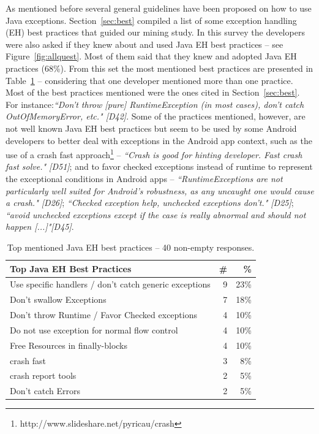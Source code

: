 
As mentioned before several general guidelines have been proposed on how to
use Java exceptions. Section~\ref{sec:best}  compiled a list of some exception handling (EH) best practices that guided our mining study. In this survey the developers were also asked if they knew about and used Java EH best practices -- see Figure~\ref{fig:allquest}. Most of them said that they knew and adopted Java EH practices (68\%). From this set the most mentioned best practices are presented in Table~\ref{tab:javapractices} -- considering that one developer mentioned more than one practice. Most of the best practices mentioned were the ones cited in Section~\ref{sec:best}. For instance:\emph{``Don't throw [pure] RuntimeException (in most cases), don't catch OutOfMemoryError, etc." [D42]}. Some of the practices mentioned, however, are not well known Java EH best practices but seem to be used by some Android developers to better deal with exceptions in the Android app context, such as the use of a crash fast approach\footnote{http://www.slideshare.net/pyricau/crash} -- \emph{``Crash is good for hinting developer. Fast crash fast solve." [D51]}; and to favor checked exceptions instead of runtime to represent the exceptional conditions in Android apps -- \emph{``RuntimeExceptions are not particularly well suited for Android's robustness, as any uncaught one would cause a crash." [D26]}; \emph{``Checked exception help, unchecked exceptions don't." [D25]}; \emph{``avoid unchecked exceptions except if the case is really abnormal and should not happen [...]"[D45]}.

\begin{table}
\scriptsize
\centering
\begin{tabular}{lrr}
\hline
\bfseries{Top Java EH Best Practices} & \bfseries{\#} & \bfseries{\%} \\
\hline
Use specific handlers / don't catch generic exceptions	& 9 & 23\% \\
Don't swallow Exceptions	 & 7 & 18\% \\
Don't throw Runtime / Favor Checked exceptions & 4 &	10\% \\
Do not use exception for normal  flow control &	4 &	10\% \\
Free Resources in finally-blocks	& 4	& 10\% \\
crash fast	 & 3 &	8\% \\
crash report tools	&  2 &	5\% \\
Don't catch Errors 	&  2 &	5\% \\
\hline
\end{tabular}
\caption{Top mentioned Java EH best practices -- 40 non-empty responses. }
\label{tab:javapractices}
\end{table}			
				
